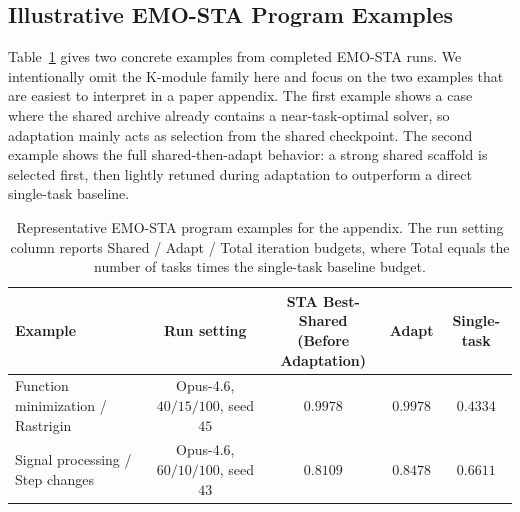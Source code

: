 %

\subsection{Illustrative EMO-STA Program Examples}
\label{app:emo-sta-program-examples}

Table~\ref{tab:emo-sta-program-examples} gives two concrete examples from completed EMO-STA runs. We intentionally omit the K-module family here and focus on the two examples that are easiest to interpret in a paper appendix. The first example shows a case where the shared archive already contains a near-task-optimal solver, so adaptation mainly acts as selection from the shared checkpoint. The second example shows the full shared-then-adapt behavior: a strong shared scaffold is selected first, then lightly retuned during adaptation to outperform a direct single-task baseline.

\begin{table}[t]
\centering
\small
\setlength{\tabcolsep}{4pt}
\renewcommand{\arraystretch}{1.12}
\begin{tabular}{lcccc}
\hline
Example & Run setting & \shortstack{STA Best-Shared\\(Before Adaptation)} & Adapt & Single-task \\
\hline
Function minimization / Rastrigin
& Opus-4.6, $40/15/100$, seed $45$
& $0.9978$
& $0.9978$
& $0.4334$ \\
Signal processing / Step changes
& Opus-4.6, $60/10/100$, seed $43$
& $0.8109$
& $0.8478$
& $0.6611$ \\
\hline
\end{tabular}
\caption{Representative EMO-STA program examples for the appendix. The run setting column reports Shared / Adapt / Total iteration budgets, where Total equals the number of tasks times the single-task baseline budget.}
\label{tab:emo-sta-program-examples}
\end{table}

